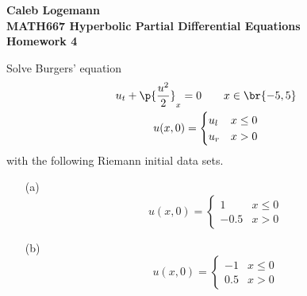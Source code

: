 \documentclass[11pt, oneside]{article}
\begin{document}
\noindent \textbf{\Large{Caleb Logemann \\
MATH667 Hyperbolic Partial Differential Equations \\
Homework 4
}}

%
Solve Burgers' equation
\begin{gather}
    u_t + \p{\frac{u^2}{2}}_x = 0 \qquad x \in \br{-5, 5} \\
    u(x, 0) = 
    \begin{cases}
      u_l & x \le 0 \\
      u_r & x > 0
    \end{cases}
\end{gather}
with the following Riemann initial data sets.

\begin{enumerate}
  \item[(a)]
    \[
      u(x, 0) =
      \begin{cases}
        1 & x \le 0 \\
        -0.5 & x > 0
      \end{cases}
    \]

  \item[(b)]
    \[
      u(x, 0) =
      \begin{cases}
        -1 & x \le 0 \\
        0.5 & x > 0
      \end{cases}
    \]
\end{enumerate}
\end{document}
